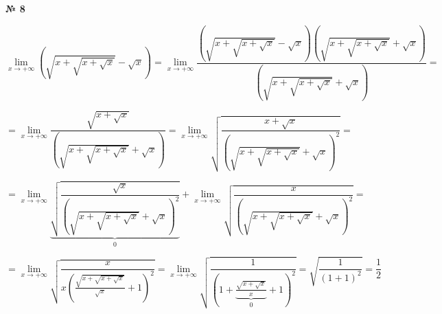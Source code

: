 \documentclass{article}
\begin{document}
\textbf{№ 8} 

$$ \lim\limits_{x \to +\infty} \left(\sqrt{x+\sqrt{x+\sqrt{x}}} - \sqrt{x} \right)
= \lim\limits_{x \to +\infty} \frac{\left(\sqrt{x+\sqrt{x+\sqrt{x}}} - \sqrt{x} \right) \left(\sqrt{x+\sqrt{x+\sqrt{x}}} + \sqrt{x} \right)}{\left(\sqrt{x+\sqrt{x+\sqrt{x}}} + \sqrt{x} \right)}
= $$

$$ = \lim\limits_{x \to +\infty} \frac{\sqrt{x+\sqrt{x}}}{\left( \sqrt{x+\sqrt{x+\sqrt{x}}} + \sqrt{x} \right)}
= \lim\limits_{x \to +\infty} \sqrt{\frac{x+\sqrt{x}}{\left( \sqrt{x+\sqrt{x+\sqrt{x}}} + \sqrt{x} \right)^2}}
= $$

$$ = \lim\limits_{x \to +\infty} \underbrace{\sqrt{\frac{\sqrt{x}}{\left( \sqrt{x+\sqrt{x+\sqrt{x}}} + \sqrt{x} \right)^2}}}_{0} + \lim\limits_{x \to +\infty} \sqrt{\frac{x}{\left( \sqrt{x+\sqrt{x+\sqrt{x}}} + \sqrt{x} \right)^2}}
= $$

$$ = \lim\limits_{x \to +\infty} \sqrt{\frac{x}{x\left( \frac{\sqrt{x+\sqrt{x+\sqrt{x}}}}{\sqrt{x}} + 1 \right)^2}}
= \lim\limits_{x \to +\infty} \sqrt{\frac{1}{\left( 1 + \underbrace{\frac{\sqrt{x+\sqrt{x}}}{x}}_{0} + 1 \right)^2}}
= \sqrt{\frac{1}{(1+1)^2}} 
= \frac{1}{2} $$
\end{document}
